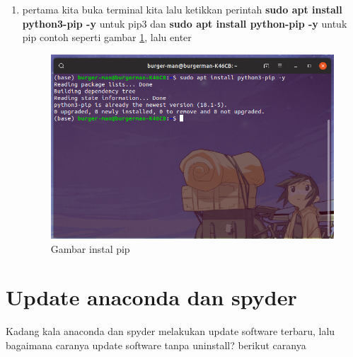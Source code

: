 \begin{enumerate}

\item pertama kita buka terminal kita lalu ketikkan perintah \textbf{sudo apt install python3-pip -y} untuk pip3 dan \textbf{sudo apt install python-pip -y} untuk pip contoh seperti gambar \ref{installpip}, lalu enter
\begin{figure}[H]
\centering
\includegraphics[width=1\textwidth]{figures/installpip.png}
\caption{Gambar instal pip}
\label{installpip}
\end{figure}

\end{enumerate}

\section{Update anaconda dan spyder}
Kadang kala anaconda dan spyder melakukan update software terbaru, lalu bagaimana caranya update software tanpa uninstall? berikut caranya

